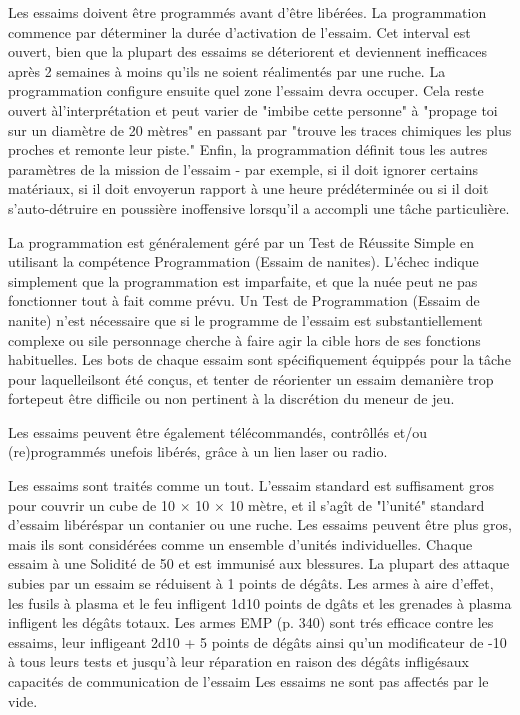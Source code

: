 Les essaims doivent être programmés avant d'être libérées. La programmation commence par déterminer la durée d'activation de l'essaim. Cet interval est ouvert, bien que la plupart des essaims se déteriorent et deviennent inefficaces après 2 semaines à moins qu'ils ne soient réalimentés par une ruche. La programmation configure ensuite quel zone l'essaim devra occuper. Cela reste ouvert àl'interprétation et peut varier de "imbibe cette personne" à "propage toi sur un diamètre de 20 mètres" en passant par "trouve les traces chimiques les plus proches et remonte leur piste." Enfin, la programmation définit tous les autres paramètres de la mission de l'essaim - par exemple, si il doit ignorer certains matériaux, si il doit envoyerun rapport à une heure prédéterminée ou si il doit s'auto-détruire en poussière inoffensive lorsqu'il a accompli une tâche particulière. 

La programmation est généralement géré par un Test de Réussite Simple en utilisant la compétence Programmation (Essaim de nanites). L'échec indique simplement que la programmation est imparfaite, et que la nuée peut ne pas fonctionner tout à fait comme prévu. Un Test de Programmation (Essaim de nanite) n'est nécessaire que si le programme de l'essaim est substantiellement complexe ou sile personnage cherche à faire agir la cible hors de ses fonctions habituelles. Les bots de chaque essaim sont spécifiquement équippés pour la tâche pour laquelleilsont été conçus, et tenter de réorienter un essaim demanière trop fortepeut être difficile ou non pertinent à la discrétion du meneur de jeu. 

Les essaims peuvent être également télécommandés, contrôllés et/ou (re)programmés unefois libérés, grâce à un lien laser ou radio. 

Les essaims sont traités comme un tout. L'essaim standard est suffisament gros pour couvrir un cube de 10 $\times$ 10 $\times$ 10 mètre, et il s'agît de "l'unité" standard d'essaim libéréspar un contanier ou une ruche. Les essaims peuvent être plus gros, mais ils sont considérées comme un ensemble d'unités individuelles. Chaque essaim à une Solidité de 50 et est immunisé aux blessures. La plupart des attaque subies par un essaim se réduisent à 1 points de dégâts. Les armes à aire d'effet, les fusils à plasma et le feu infligent 1d10 points de dgâts et les grenades à plasma infligent les dégâts totaux. Les armes EMP (p. 340) sont trés efficace contre les essaims, leur infligeant 2d10 + 5 points de dégâts ainsi qu'un modificateur de -10 à tous leurs tests et jusqu'à leur réparation en raison des dégâts infligésaux capacités de communication de l'essaim Les essaims ne sont pas affectés par le vide. 

